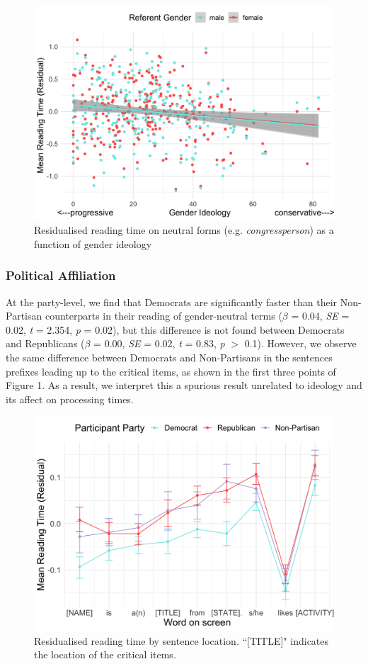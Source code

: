 \documentclass[10pt,letterpaper]{article}
\begin{document}
	\begin{figure}[h]
		\centering
		\includegraphics[scale=0.115]{sprt-neutral-ideo.png}
		\caption{Residualised reading time on neutral forms (e.g. \textit{congressperson}) as a function of gender ideology}
	\end{figure}
	
	\subsubsection{Political Affiliation}
	At the party-level, we find that Democrats are significantly faster than their Non-Partisan counterparts in their reading of gender-neutral terms ($\beta$ = 0.04, \textit{SE} = 0.02, \textit{t} = 2.354, \textit{p} = 0.02), but this difference is not found between Democrats and Republicans ($\beta$ = 0.00, \textit{SE} = 0.02, \textit{t} = 0.83, \textit{p} $>$ 0.1). However, we observe the same difference between Democrats and Non-Partisans in the sentences prefixes leading up to the critical items, as shown in the first three points of Figure 1. As a result, we interpret this a spurious result unrelated to ideology and its affect on processing times.
	
	\begin{figure}[h]
		\centering
		\includegraphics[scale=0.115]{sprt-neutral-all-regions-poli-party.png}
		\caption{Residualised reading time by sentence location. ``[TITLE]" indicates the location of the critical items.}
	\end{figure}
\end{document}
